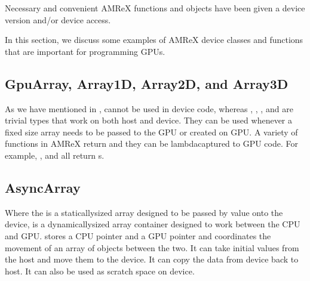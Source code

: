 \documentclass[letterpaper,10pt,english]{sphinxmanual}
\begin{document}
\sphinxAtStartPar
Necessary and convenient AMReX functions and objects have been given a device
version and/or device access.

\sphinxAtStartPar
In this section, we discuss some examples of AMReX device classes and functions
that are important for programming GPUs.


\subsection{GpuArray, Array1D, Array2D, and Array3D}
\label{\detokenize{GPU:gpuarray-array1d-array2d-and-array3d}}
\sphinxAtStartPar
As we have mentioned in {\hyperref[\detokenize{Basics:sec-basics-vecandarr}]{}}, 
cannot be used in device code, whereas ,
, , and  are trivial types
that work on both host and device. They can be used whenever a fixed size array
needs to be passed to the GPU or created on GPU.  A variety of
functions in AMReX return  and they can be
lambda\sphinxhyphen{}captured to GPU code. For example,
, 
and  all return s.


\subsection{AsyncArray}
\label{\detokenize{GPU:asyncarray}}\label{\detokenize{GPU:sec-gpu-classes-asyncarray}}
\sphinxAtStartPar
Where the  is a statically\sphinxhyphen{}sized array designed to be
passed by value onto the device,  is a
dynamically\sphinxhyphen{}sized array container designed to work between the CPU and
GPU.  stores a CPU pointer and a GPU pointer and
coordinates the movement of an array of objects between the two.  It
can take initial values from the host and move them to the device.  It
can copy the data from device back to host.  It can also be used as
scratch space on device.
\end{document}
